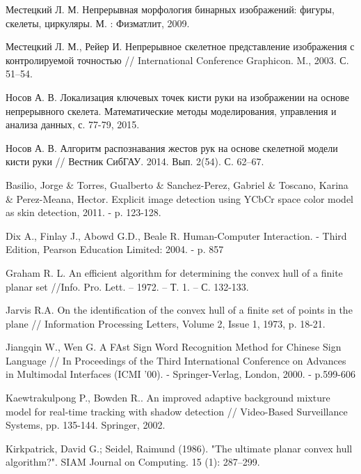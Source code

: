 \newpage
\begin{thebibliography}{99}

Местецкий Л. М. Непрерывная морфология бинарных изображений: фигуры,
скелеты, циркуляры. М. : Физматлит, 2009.

Местецкий Л. М., Рейер И. Непрерывное скелетное представление 
изображения с контролируемой точностью // International Conference
Graphicon. M., 2003. С. 51–54.

Носов А. В. Локализация ключевых точек кисти руки на изображении на
основе непрерывного скелета. Математические методы моделирования,
управления и анализа данных, с. 77-79, 2015.

Носов А. В. Алгоритм распознавания жестов
рук на основе скелетной модели кисти руки // Вестник
СибГАУ. 2014. Вып. 2(54). С. 62–67.

Basilio, Jorge \& Torres, Gualberto \& Sanchez-Perez, Gabriel \& Toscano,
Karina \& Perez-Meana, Hector. Explicit image detection using
YCbCr space color model as skin detection, 2011. - p. 123-128. 

Dix A., Finlay J., Abowd G.D., Beale R. Human-Computer Interaction. - Third Edition, Pearson
Education Limited: 2004. - p. 857

Graham R. L. An efficient algorithm for determining the
convex hull of a finite planar set //Info. Pro. Lett. –
1972. – Т. 1. – С. 132-133.

Jarvis R.A. On the identification of the convex hull of a finite set of
points in the plane // Information Processing Letters, Volume 2,
Issue 1, 1973, p. 18-21.

Jiangqin W., Wen G. A FAst Sign Word Recognition Method for Chinese Sign Language // In 
Proceedings of the Third International Conference on Advances in Multimodal Interfaces (ICMI 
'00). - Springer-Verlag, London, 2000. - p.599-606

Kaewtrakulpong P., Bowden R.. An improved adaptive 
background mixture model for real-time tracking with
shadow detection // Video-Based Surveillance Systems, pp.
135-144. Springer, 2002.

Kirkpatrick, David G.; Seidel, Raimund (1986). "The ultimate planar
convex hull algorithm?". SIAM Journal on Computing. 15 (1): 287–299.


\end{thebibliography}
